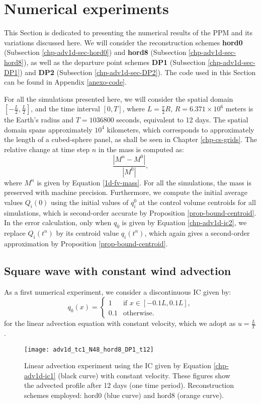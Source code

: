 \section{Numerical experiments}
\label{chp-adv1d-sec-numerical-exp}
This Section is dedicated to presenting the numerical results of the PPM and 
its variations discussed here. We will consider the reconstruction
schemes \textbf{hord0} (Subsection \ref{chp-adv1d-sec-hord0}) and 
\textbf{hord8} (Subsection \ref{chp-adv1d-sec-hord8}), as well as the departure point schemes
\textbf{DP1} (Subsection \ref{chp-adv1d-sec-DP1}) and \textbf{DP2} (Subsection \ref{chp-adv1d-sec-DP2}).
The code used in this Section can be found in Appendix \ref{anexo-code}.

For all the simulations presented here, we will consider the spatial domain $[-\frac{L}{2},\frac{L}{2}]$,
and the time interval $[0,T]$,  where $L = \frac{\pi}{2} R$, $R = 6.371 \times 10^{6}$ meters is the Earth's radius and
$T = 1036800$ seconds, equivalent to 12 days.
The spatial domain spans approximately $10^4$ kilometers, which corresponds to approximately the length of a cubed-sphere panel,
as shall be seen in Chapter \ref{chp-cs-grids}.
The relative change at time step $n$ in the mass is computed as:
\begin{equation*}
	\frac{|M^n-M^0|}{|M^0|},
\end{equation*}
where $M^n$ is given by Equation \eqref{1d-fv-mass}.
For all the simulations, the
mass is preserved with machine precision. Furthermore,
we compute the initial average values $Q_i(0)$ using
the initial values of $q^0_i$ at the control volume centroids for all simulations,
which is second-order accurate by Proposition \ref{prop-bound-centroid}. 
In the error calculation, only when $q_0$ is given by Equation \eqref{chp-adv1d-ic2},
we replace $Q_{i}(t^n)$ by its centroid value $q_{i}(t^n)$, which again gives
a second-order approximation by Proposition \ref{prop-bound-centroid}.

\subsection{Square wave with constant wind advection}
\label{chp-adv1d-sec-numerical-exp-1}
As a first numerical experiment, we consider
a discontinuous IC given by:
\begin{equation}
	\label{chp-adv1d-ic1}
		q_0(x) =  
  \begin{cases}
		1 & \text{if } x \in [-0.1L,0.1L],\\
		0.1 & \text{otherwise}.
  \end{cases}
\end{equation}
for the linear advection equation with constant velocity, which we adopt as $u=\frac{L}{T}$.
\begin{figure}[!htb]
	\centering
	\texttt{[image: adv1d\_tc1\_N48\_hord8\_DP1\_t12]}
	\caption{Linear advection experiment using the IC given by Equation \eqref{chp-adv1d-ic1} (black curve) with constant velocity.
		These figures show the advected profile after 12 days (one time period).
		Reconstruction schemes employed: hord0 (blue curve) and hord8 (orange curve).\label{chp-adv1d-sec-exp-adv1}}
\end{figure}

